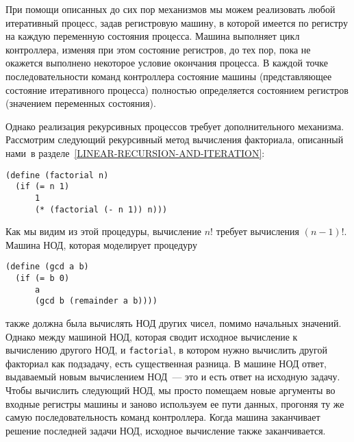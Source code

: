 При помощи описанных до сих пор механизмов мы можем
реализовать любой итеративный процесс, задав регистровую машину, в
которой имеется по регистру на каждую переменную состояния процесса.
Машина выполняет цикл контроллера, изменяя при этом состояние
регистров, до тех пор, пока не окажется выполнено некоторое условие
окончания процесса.  В каждой точке последовательности команд
контроллера состояние машины (представляющее состояние итеративного
процесса) полностью определяется состоянием регистров (значением
переменных состояния).

  
Однако реализация рекурсивных процессов требует
дополнительного механизма.  Рассмотрим следующий рекурсивный метод
вычисления факториала, описанный нами~в 
разделе~\ref{LINEAR-RECURSION-AND-ITERATION}:

\begin{Verbatim}[fontsize=\small]
(define (factorial n)
  (if (= n 1)
      1
      (* (factorial (- n 1)) n)))
\end{Verbatim}
Как мы видим из этой процедуры, вычисление $n!$ требует
вычисления $(n-1)!$.  Машина НОД, которая моделирует
процедуру

\begin{Verbatim}[fontsize=\small]
(define (gcd a b)
  (if (= b 0)
      a
      (gcd b (remainder a b))))
\end{Verbatim}
также должна была вычислять НОД других чисел, помимо начальных
значений.  Однако между машиной НОД, которая сводит исходное
вычисление к вычислению другого НОД, и {\tt factorial}, в
котором нужно вычислить другой факториал как подзадачу, есть
существенная разница. В машине НОД
ответ, выдаваемый новым вычислением НОД~--- это и есть ответ на исходную
задачу.  Чтобы вычислить следующий НОД, мы просто помещаем новые
аргументы во входные регистры машины и заново используем ее пути
данных, прогоняя ту же самую последовательность команд контроллера.
Когда машина заканчивает решение последней задачи НОД, исходное вычисление
также заканчивается.

